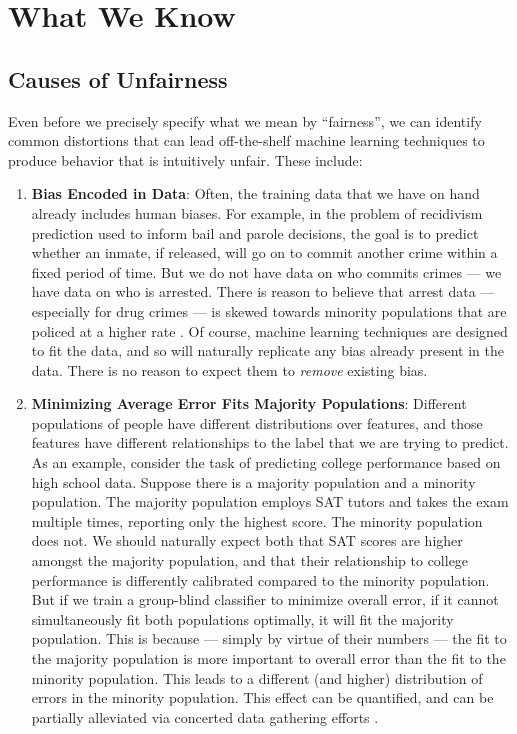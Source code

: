 \section{What We Know}
\subsection{Causes of Unfairness}
Even before we precisely specify what we mean by ``fairness'', we can identify common distortions that can lead off-the-shelf machine learning techniques to produce behavior that is intuitively unfair. These include:
\begin{enumerate}
\item \textbf{Bias Encoded in Data}: Often, the training data that we have on hand already includes human biases. For example, in the problem of recidivism prediction used to inform bail and parole decisions, the goal is to predict whether an inmate, if released, will go on to commit another crime within a fixed period of time. But we do not have data on who commits crimes --- we have data on who is arrested. There is reason to believe that arrest data --- especially for drug crimes --- is skewed towards minority populations that are policed at a higher rate \cite{rothwell2014war}. Of course, machine learning techniques are designed to fit the data, and so will naturally replicate any bias already present in the data.  There is no reason to expect them to \emph{remove} existing bias.
\item \textbf{Minimizing Average Error Fits Majority Populations}: Different populations of people have different distributions over features, and those features have different relationships to the label that we are trying to predict. As an example, consider the task of predicting college performance based on high school data. Suppose there is a majority population and a minority population. The majority population employs SAT tutors and takes the exam multiple times, reporting only the highest score. The minority population does not. We should naturally expect both that SAT scores are higher amongst the majority population, and that their relationship to college performance is differently calibrated compared to the minority population. But if we train a group-blind classifier to minimize overall error, if it cannot simultaneously fit both populations optimally, it will fit the majority population. This is because --- simply by virtue of their numbers --- the fit to the majority population is more important to overall error than the fit to the minority population. This leads to a different (and higher) distribution of errors in the minority population. This effect can be quantified, and can be partially alleviated via concerted data gathering efforts \cite{CJS18}.

\end{enumerate}

